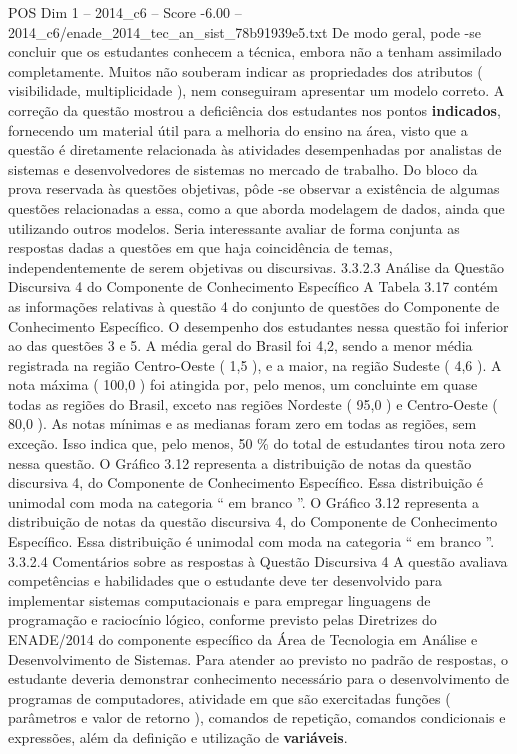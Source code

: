 \begin{textsample}{POS Dim 1 – 2014\_c6 – Score -6.00 – 2014\_c6/enade\_2014\_tec\_an\_sist\_78b91939e5.txt}
De modo geral, pode -se concluir que os estudantes conhecem a técnica, embora não a tenham assimilado completamente.
Muitos não souberam indicar as propriedades dos atributos ( visibilidade, multiplicidade ), nem conseguiram apresentar um modelo correto.
A correção da questão mostrou a deficiência dos estudantes nos pontos \textbf{indicados}, fornecendo um material útil para a melhoria do ensino na área, visto que a questão é diretamente relacionada às atividades desempenhadas por analistas de sistemas e desenvolvedores de sistemas no mercado de trabalho.
Do bloco da prova reservada às questões objetivas, pôde -se observar a existência de algumas questões relacionadas a essa, como a que aborda modelagem de dados, ainda que utilizando outros modelos.
Seria interessante avaliar de forma conjunta as respostas dadas a questões em que haja coincidência de temas, independentemente de serem objetivas ou discursivas. 3.3.2.3 Análise da Questão Discursiva 4 do Componente de Conhecimento Específico A Tabela 3.17 contém as informações relativas à questão 4 do conjunto de questões do Componente de Conhecimento Específico.
O desempenho dos estudantes nessa questão foi inferior ao das questões 3 e 5.
A média geral do Brasil foi 4,2, sendo a menor média registrada na região Centro-Oeste ( 1,5 ), e a maior, na região Sudeste ( 4,6 ).
A nota máxima ( 100,0 ) foi atingida por, pelo menos, um concluinte em quase todas as regiões do Brasil, exceto nas regiões Nordeste ( 95,0 ) e Centro-Oeste ( 80,0 ).
As notas mínimas e as medianas foram zero em todas as regiões, sem exceção.
Isso indica que, pelo menos, 50 \% do total de estudantes tirou nota zero nessa questão.
O Gráfico 3.12 representa a distribuição de notas da questão discursiva 4, do Componente de Conhecimento Específico.
Essa distribuição é unimodal com moda na categoria “ em branco ”.
O Gráfico 3.12 representa a distribuição de notas da questão discursiva 4, do Componente de Conhecimento Específico.
Essa distribuição é unimodal com moda na categoria “ em branco ”. 3.3.2.4 Comentários sobre as respostas à Questão Discursiva 4 A questão avaliava competências e habilidades que o estudante deve ter desenvolvido para implementar sistemas computacionais e para empregar linguagens de programação e raciocínio lógico, conforme previsto pelas Diretrizes do ENADE/2014 do componente específico da Área de Tecnologia em Análise e Desenvolvimento de Sistemas.
Para atender ao previsto no padrão de respostas, o estudante deveria demonstrar conhecimento necessário para o desenvolvimento de programas de computadores, atividade em que são exercitadas funções ( parâmetros e valor de retorno ), comandos de repetição, comandos condicionais e expressões, além da definição e utilização de \textbf{variáveis}.

\end{textsample}
